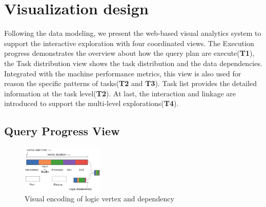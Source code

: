 
\section{Visualization design}
Following the data modeling, we present the web-based visual analytics system to support the interactive exploration with four coordinated views. The Execution progress demonstrates the overview about how the query plan are execute(\textbf{T1}), the Task distribution view shows the task distribution and the data dependencies. Integrated with the machine performance metrics, this view is also used for reason the specific patterns of tasks(\textbf{T2} and \textbf{T3}).  Task list provides the detailed information at the task level(\textbf{T2}).  At last, the interaction and linkage are introduced to support the multi-level explorations(\textbf{T4}).

\subsection{Query Progress View}\label{sec:queryprogress}


\begin{figure}[t]
	\centering
	\includegraphics[width=0.35\textwidth]{figures/visualization/progressdesign.pdf}
	\vspace{-3mm}
	\caption{Visual encoding of logic vertex and dependency}
	\label{fig:progress}
	\vspace{-3mm}
\end{figure}

